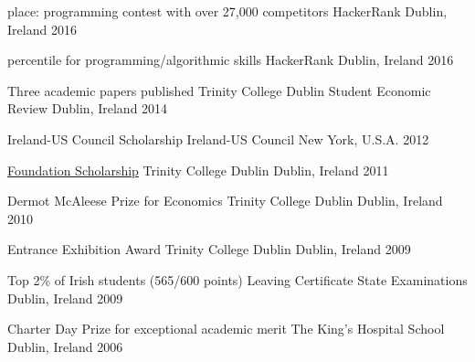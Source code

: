  
    \begin{cvhonors}
       
       \cvhonor
        { place: programming contest with over 27,000 competitors}
        {HackerRank}
        {Dublin, Ireland}
        {2016}
       
       \cvhonor
        { percentile for programming/algorithmic skills}
        {HackerRank}
        {Dublin, Ireland}
        {2016}
       
      \cvhonor
       {Three academic papers published}
       {Trinity College Dublin Student Economic Review}
       {Dublin, Ireland}
       {2014}


       
       \cvhonor
        {Ireland-US Council Scholarship}
        {Ireland-US Council}
        {New York, U.S.A.}
        {2012}
      
      \cvhonor
        {\href{https://en.wikipedia.org/wiki/Trinity_College,_Dublin\#Scholarship}{\textcolor{awesome-skyblue}{Foundation Scholarship}}}
        {Trinity College Dublin}
        {Dublin, Ireland}
        {2011}
      
      \cvhonor
        {Dermot McAleese Prize for Economics}
        {Trinity College Dublin}
        {Dublin, Ireland}
        {2010}
      
      \cvhonor
        {Entrance Exhibition Award}
        {Trinity College Dublin}
        {Dublin, Ireland}
        {2009}
      
      \cvhonor
        {Top 2\% of Irish students (565/600 points)}
        {Leaving Certificate State Examinations}
        {Dublin, Ireland}
        {2009}
      
      \cvhonor
        {Charter Day Prize for exceptional academic merit}
        {The King's Hospital School}
        {Dublin, Ireland}
        {2006}
    \end{cvhonors}

  


 
   